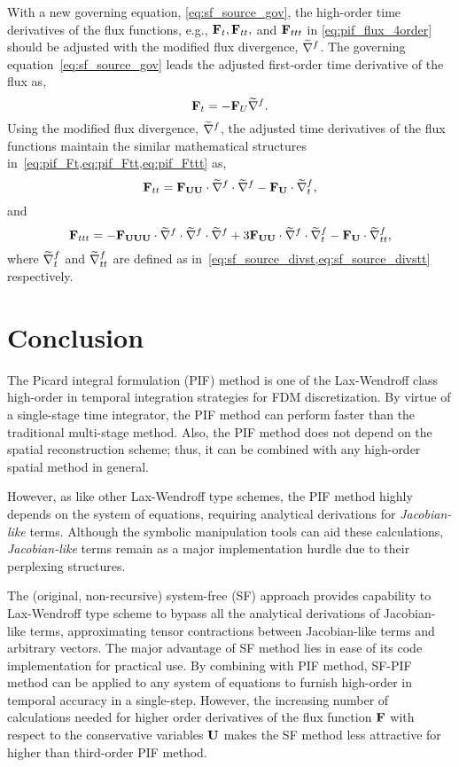 With a new governing equation, \cref{eq:sf_source_gov},
the high-order time derivatives of the flux functions, e.g., \( \mathbf{F}_{t}, \mathbf{F}_{tt}, \) and \( \mathbf{F}_{ttt} \)
in \cref{eq:pif_flux_4order}
should be adjusted with the modified flux divergence, \( \widetilde{\nabla}^{f} \).
The governing equation~\cref{eq:sf_source_gov} leads
the adjusted first-order time derivative of the flux as,
\begin{equation}\label{eq:sf_source_Ft}
    \mathbf{F}_{t} = -\mathbf{F}_{U} \widetilde{\nabla}^{f}.
\end{equation}
Using the modified flux divergence, \( \widetilde{\nabla}^{f} \), the adjusted time derivatives of the flux functions
maintain the similar mathematical structures in~\cref{eq:pif_Ft,eq:pif_Ftt,eq:pif_Fttt} as,
\begin{equation}\label{eq:sf_source_Ftt}
    \mathbf{F}_{tt} = \mathbf{F}_{\mathbf{U} \mathbf{U}} \cdot \widetilde{\nabla}^{f} \cdot \widetilde{\nabla}^{f} - \mathbf{F}_{\mathbf{U}} \cdot \widetilde{\nabla}^{f}_{t},
\end{equation}
and
\begin{equation}\label{eq:sf_source_Fttt}
    \mathbf{F}_{ttt} = -\mathbf{F}_{\mathbf{U} \mathbf{U} \mathbf{U}} \cdot \widetilde{\nabla}^{f} \cdot \widetilde{\nabla}^{f} \cdot \widetilde{\nabla}^{f}
    + 3 \mathbf{F}_{\mathbf{U} \mathbf{U}} \cdot \widetilde{\nabla}^{f} \cdot \widetilde{\nabla}^{f}_{t}
    - \mathbf{F}_{\mathbf{U}} \cdot \widetilde{\nabla}^{f}_{tt},
\end{equation}
where \( \widetilde{\nabla}^{f}_{t} \) and \( \widetilde{\nabla}^{f}_{tt} \) are defined as in~\cref{eq:sf_source_divst,eq:sf_source_divstt} respectively.




\section{Conclusion}\label{sec:sf_conclusion}

The Picard integral formulation (PIF) method is one of the Lax-Wendroff class
high-order in temporal integration strategies for FDM discretization.
By virtue of a single-stage time integrator, the PIF method can perform
faster than the traditional multi-stage method.
Also, the PIF method does not depend on the spatial reconstruction scheme;
thus, it can be combined with any high-order spatial method in general.

However, as like other Lax-Wendroff type schemes,
the PIF method highly depends on the system of equations,
requiring analytical derivations for \textit{Jacobian-like} terms.
Although the symbolic manipulation tools can aid these calculations,
\textit{Jacobian-like} terms remain as a major implementation hurdle due to their perplexing structures.

The (original, non-recursive) system-free (SF) approach provides capability
to Lax-Wendroff type scheme to bypass all the analytical derivations of Jacobian-like terms,
approximating tensor contractions between Jacobian-like terms and arbitrary vectors.
The major advantage of SF method lies in ease of its code implementation for practical use.
By combining with PIF method, SF-PIF method can be applied to any system of equations
to furnish high-order in temporal accuracy in a single-step.
However, the increasing number of calculations needed for
higher order derivatives of the flux function \( \mathbf{F} \) with respect to the conservative variables \( \mathbf{U} \)
makes the SF method less attractive for higher than third-order PIF method.

